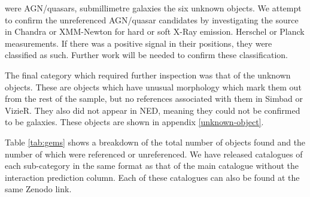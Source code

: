 {\DIFdelbegin {}\DIFdelend \DIFaddbegin {}\DIFaddend were AGN/quasars, submillimetre galaxies \DIFdelbegin {}\DIFdelend \DIFaddbegin {}\DIFaddend the six unknown objects. We attempt to confirm the unreferenced AGN/quasar \DIFdelbegin {}\DIFdelend candidates by investigating the source in Chandra or XMM-Newton for hard or soft X-Ray emission. \DIFdelbegin {}\DIFdelend \DIFaddbegin {}\textit{} \textit{} \DIFaddend Herschel or Planck measurements. If there was a positive signal in their positions, they were classified as such. Further work will be needed to confirm these classification.

The final category which required further inspection was that of the unknown objects. These are objects which have unusual morphology which mark them out from the rest of the sample, but no references associated with them in Simbad or VizieR. They also did not appear in NED, meaning they could not be confirmed to be galaxies. These objects are shown in appendix \ref{unknown-object}.

Table \ref{tab:gems} shows a breakdown of the total number of objects found and the number of which were referenced or unreferenced. We have released catalogues of each sub-category in the same format as that of the main catalogue without the interaction prediction column. Each of these catalogues can also be found at the same Zenodo link.


}
